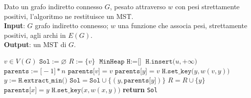 \documentclass[14pt]{extreport}
\theoremstyle{definition}
\theoremstyle{definition}
\begin{document}
\begin{algorithm}[H]
    \caption{
        Dato un grafo indiretto connesso $G$, pesato attraverso $w$ con pesi strettamente positivi, l'algoritmo ne restituisce un MST.\\
        \textbf{Input}: $G$ grafo indiretto connesso; $w$ una funzione che associa pesi, strettamente positivi, agli archi in $E(G)$.\\
        \textbf{Output}: un MST di $G$.
    }

    \begin{algorithmic}[1]
            \State $v \in V(G)$
            \State $\texttt{Sol} := \varnothing$
            \State $R := \{v\}$
            \State $\texttt{MinHeap H} := \texttt{[]}$
                \State $\texttt{H.insert(}u, +\infty\texttt{)}$
            \EndFor
            \State $\texttt{parents} := \texttt{[}-1\texttt{]} * n$
            \State $\texttt{parents[}v\texttt{]} = v$
                \State $\texttt{parents[}y\texttt{]} = v$
                \State $\texttt{H.set\_key(}y, w(v, y)\texttt{)}$
            \EndFor
                \State $y := \texttt{H.extract\_min()}$ 
                    \State $\texttt{Sol} = \texttt{Sol} \cup \{ (y, \texttt{parents[}y\texttt{]}) \}$
                \State $R = R \cup \{y\}$
                        \State $\texttt{parents[}x\texttt{]} = y$
                        \State $\texttt{H.set\_key(}x, w(x, y)\texttt{)}$
                    \EndIf
                \EndFor
            \EndWhile
            \State \textbf{return} \texttt{Sol}
        \EndFunction
    \end{algorithmic}
\end{algorithm}
\end{document}
